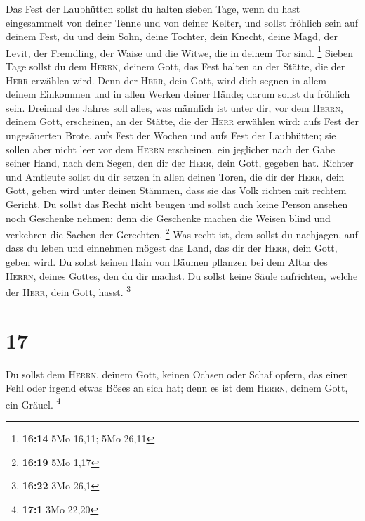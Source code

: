  Das Fest der Laubhütten sollst du halten sieben Tage,
wenn du hast eingesammelt von deiner Tenne und von deiner Kelter,
 und sollst fröhlich sein auf deinem Fest, du und dein
Sohn, deine Tochter, dein Knecht, deine Magd, der Levit, der Fremdling,
der Waise und die Witwe, die in deinem Tor sind. \footnote{\textbf{16:14}
  5Mo 16,11; 5Mo 26,11}  Sieben Tage sollst du dem
\textsc{Herrn}, deinem Gott, das Fest halten an der Stätte, die der
\textsc{Herr} erwählen wird. Denn der \textsc{Herr}, dein Gott, wird
dich segnen in allem deinem Einkommen und in allen Werken deiner Hände;
darum sollst du fröhlich sein.  Dreimal des Jahres soll
alles, was männlich ist unter dir, vor dem \textsc{Herrn}, deinem Gott,
erscheinen, an der Stätte, die der \textsc{Herr} erwählen wird: aufs
Fest der ungesäuerten Brote, aufs Fest der Wochen und aufs Fest der
Laubhütten; sie sollen aber nicht leer vor dem \textsc{Herrn}
erscheinen,  ein jeglicher nach der Gabe seiner Hand,
nach dem Segen, den dir der \textsc{Herr}, dein Gott, gegeben hat.
 Richter und Amtleute sollst du dir setzen in allen
deinen Toren, die dir der \textsc{Herr}, dein Gott, geben wird unter
deinen Stämmen, dass sie das Volk richten mit rechtem Gericht.
 Du sollst das Recht nicht beugen und sollst auch keine
Person ansehen noch Geschenke nehmen; denn die Geschenke machen die
Weisen blind und verkehren die Sachen der Gerechten. \footnote{\textbf{16:19}
  5Mo 1,17}  Was recht ist, dem sollst du nachjagen, auf
dass du leben und einnehmen mögest das Land, das dir der \textsc{Herr},
dein Gott, geben wird.  Du sollst keinen Hain von Bäumen
pflanzen bei dem Altar des \textsc{Herrn}, deines Gottes, den du dir
machst.  Du sollst keine Säule aufrichten, welche der
\textsc{Herr}, dein Gott, hasst. \footnote{\textbf{16:22} 3Mo 26,1}

\hypertarget{section-2}{%
\section{17}\label{section-2}}

 Du sollst dem \textsc{Herrn}, deinem Gott, keinen Ochsen
oder Schaf opfern, das einen Fehl oder irgend etwas Böses an sich hat;
denn es ist dem \textsc{Herrn}, deinem Gott, ein Gräuel. \footnote{\textbf{17:1}
  3Mo 22,20}

